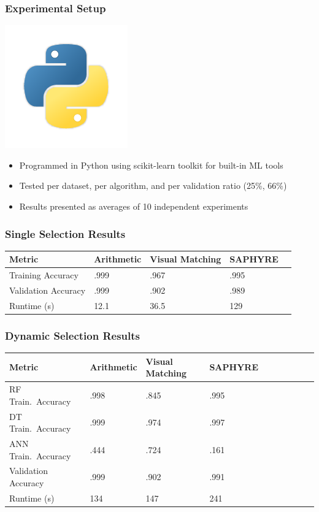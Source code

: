 \documentclass{beamer}
\begin{document}
\begin{frame}
\frametitle{Experimental Setup}
\begin{center}
\includegraphics[width=.2\textwidth]{python}
\end{center}
\begin{itemize}
\item{Programmed in Python using scikit-learn toolkit for built-in ML tools}
\item{Tested per dataset, per algorithm, and per validation ratio (25\%, 66\%)}
\item{Results presented as averages of 10 independent experiments}
\end{itemize}
\end{frame}

\begin{frame}
\frametitle{Single Selection Results}
\begin{table}[!t]
\renewcommand{\arraystretch}{1.3}
\centering
{\begin{tabular}{*{5}{l}}
\toprule
Metric & Arithmetic & Visual Matching & SAPHYRE \\ \midrule
Training Accuracy & .999 & .967 & .995 \\
Validation Accuracy & .999 & .902 & .989 \\
Runtime (s) & 12.1 & 36.5 & 129 \\ \bottomrule
\end{tabular}}
\end{table}
\end{frame}

\begin{frame}
\frametitle{Dynamic Selection Results}
\begin{table}[!t]
\renewcommand{\arraystretch}{1.2}
\centering
{\begin{tabular}{*{10}{l}}
\toprule
Metric & Arithmetic & Visual Matching & SAPHYRE \\ \midrule
RF Train.~Accuracy & .998 & .845 & .995 \\
DT Train.~Accuracy & .999 & .974 & .997 \\
ANN Train.~Accuracy & .444 & .724 & .161 \\
Validation Accuracy & .999 & .902 & .991 \\
Runtime (s) & 134 & 147 & 241 \\ \bottomrule
\end{tabular}}
\label{dyn-all}
\end{table}
\end{frame}
\end{document}
